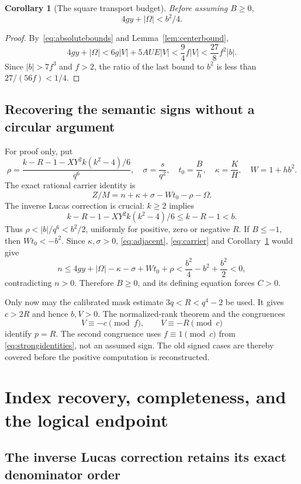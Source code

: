 \documentclass[11pt]{article}
\newtheorem{corollary}[theorem]{Corollary}
\theoremstyle{remark}\newtheorem{remark}[theorem]{Remark}
\begin{document}
\begin{corollary}[The square transport budget]\label{cor:budget}
Before assuming $B\ge0$,
\[
 4gy+|\Omega|<b^2/4.
\]
\end{corollary}
\begin{proof}
By~\eqref{eq:absolutebounds} and Lemma~\ref{lem:centerbound},
\[
 4gy+|\Omega|
 <6g|V|+5AUE|V|
 <\frac94f|V|
 <\frac{27}{8}f^2|b|.
\]
Since $|b|>7f^3$ and $f>2$, the ratio of the last bound to $b^2$
is less than $27/(56f)<1/4$.
\end{proof}

\subsection{Recovering the semantic signs without a circular argument}

For proof only, put
\[
 \rho=\frac{k-R-1-XY^2k(k^2-4)/6}{q^6},\quad
 \sigma=\frac{s}{q^2},\quad t_0=\frac{B}{h},\quad
 \kappa=\frac KH,\quad W=1+hb^2.
\]
The exact rational carrier identity is
\begin{equation}\label{eq:carrier}
 Z/M=n+\kappa+\sigma-Wt_0-\rho-\Omega.
\end{equation}
The inverse Lucas correction is crucial: $k\ge2$ implies
\[
 k-R-1-XY^2k(k^2-4)/6\le k-R-1<b.
\]
Thus $\rho<|b|/q^6<b^2/2$, uniformly for positive, zero or negative
$R$. If $B\le-1$, then $Wt_0<-b^2$. Since $\kappa,\sigma>0$,
\eqref{eq:adjacent}, \eqref{eq:carrier} and
Corollary~\ref{cor:budget} would give
\[
 n\le4gy+|\Omega|-\kappa-\sigma+Wt_0+\rho
 <\frac{b^2}{4}-b^2+\frac{b^2}{2}<0,
\]
contradicting $n>0$. Therefore $B\ge0$, and its defining equation
forces $C>0$.

Only now may the calibrated mask estimate $3q<R<q^4-2$ be used.
It gives $c>2R$ and hence $b,V>0$. The normalized-rank theorem and
the congruences
\[
 V\equiv-c\pmod f,\qquad V\equiv-R\pmod c
\]
identify $p=R$. The second congruence uses $f\equiv1\pmod c$ from
\eqref{eq:strongidentities}, not an assumed sign. The old signed cases
are thereby covered before the positive computation is reconstructed.

\section{Index recovery, completeness, and the logical endpoint}

\subsection{The inverse Lucas correction retains its exact denominator order}
\end{document}
